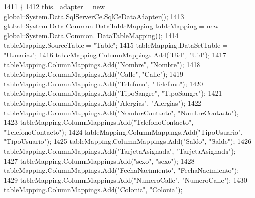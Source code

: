 \begin{DoxyCode}
1411                                    \{
1412             this.\hyperlink{class_proyecto___integrador__3_1_1ds_usuarios_table_adapters_1_1_usuarios_table_adapter_ab48b9b83ce2db01dbbc83ad45b428a80}{\_adapter} = \textcolor{keyword}{new} global::System.Data.SqlServerCe.SqlCeDataAdapter();
1413             global::System.Data.Common.DataTableMapping tableMapping = \textcolor{keyword}{new} global::System.Data.Common.
      DataTableMapping();
1414             tableMapping.SourceTable = \textcolor{stringliteral}{"Table"};
1415             tableMapping.DataSetTable = \textcolor{stringliteral}{"Usuarios"};
1416             tableMapping.ColumnMappings.Add(\textcolor{stringliteral}{"Uid"}, \textcolor{stringliteral}{"Uid"});
1417             tableMapping.ColumnMappings.Add(\textcolor{stringliteral}{"Nombre"}, \textcolor{stringliteral}{"Nombre"});
1418             tableMapping.ColumnMappings.Add(\textcolor{stringliteral}{"Calle"}, \textcolor{stringliteral}{"Calle"});
1419             tableMapping.ColumnMappings.Add(\textcolor{stringliteral}{"Telefono"}, \textcolor{stringliteral}{"Telefono"});
1420             tableMapping.ColumnMappings.Add(\textcolor{stringliteral}{"TipoSangre"}, \textcolor{stringliteral}{"TipoSangre"});
1421             tableMapping.ColumnMappings.Add(\textcolor{stringliteral}{"Alergias"}, \textcolor{stringliteral}{"Alergias"});
1422             tableMapping.ColumnMappings.Add(\textcolor{stringliteral}{"NombreContacto"}, \textcolor{stringliteral}{"NombreContacto"});
1423             tableMapping.ColumnMappings.Add(\textcolor{stringliteral}{"TelefonoContacto"}, \textcolor{stringliteral}{"TelefonoContacto"});
1424             tableMapping.ColumnMappings.Add(\textcolor{stringliteral}{"TipoUsuario"}, \textcolor{stringliteral}{"TipoUsuario"});
1425             tableMapping.ColumnMappings.Add(\textcolor{stringliteral}{"Saldo"}, \textcolor{stringliteral}{"Saldo"});
1426             tableMapping.ColumnMappings.Add(\textcolor{stringliteral}{"TarjetaAsignada"}, \textcolor{stringliteral}{"TarjetaAsignada"});
1427             tableMapping.ColumnMappings.Add(\textcolor{stringliteral}{"sexo"}, \textcolor{stringliteral}{"sexo"});
1428             tableMapping.ColumnMappings.Add(\textcolor{stringliteral}{"FechaNacimiento"}, \textcolor{stringliteral}{"FechaNacimiento"});
1429             tableMapping.ColumnMappings.Add(\textcolor{stringliteral}{"NumeroCalle"}, \textcolor{stringliteral}{"NumeroCalle"});
1430             tableMapping.ColumnMappings.Add(\textcolor{stringliteral}{"Colonia"}, \textcolor{stringliteral}{"Colonia"});

\end{DoxyCode}
